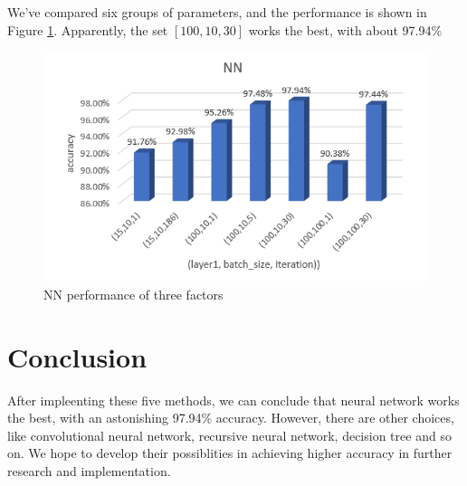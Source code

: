 \documentclass{article}
\begin{document}
	We've compared six groups of parameters, and the performance is shown in Figure \ref{nn}. Apparently, the set $[100, 10, 30]$ works the best, with about 97.94\%
	
	\begin{figure}[htbp]
		\centering
		\includegraphics[scale=0.35]{per3.png}
		\caption{NN performance of three factors}
		\label{nn}
	\end{figure}

	\section{Conclusion}
	
	After impleenting these five methods, we can conclude that neural network works the best, with an astonishing 97.94\% accuracy. However, there are other choices, like convolutional neural network, recursive neural network, decision tree and so on. We hope to develop their possiblities in achieving higher accuracy in further research and implementation.
	
	
\end{document}
